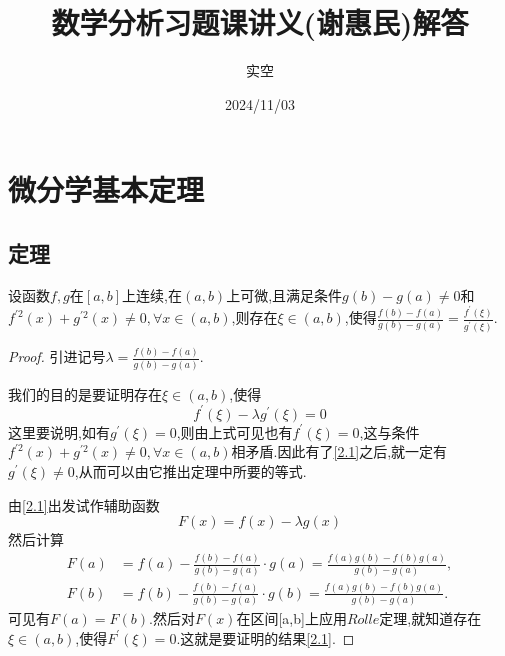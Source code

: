 \documentclass[lang=cn,newtx,10pt,scheme=chinese]{../Template/elegantbook}
\title{数学分析习题课讲义(谢惠民)解答}
\author{实空}
\date{2024/11/03}
\begin{document}
\maketitle
\frontmatter

\tableofcontents

\mainmatter%



\chapter{微分学基本定理}

\section{定理}

\begin{theorem}\label{the:2.1}
设函数$f,g$在$[a,b]$上连续,在$(a,b)$上可微,且满足条件$g(b)-g(a)\neq0$和$f^{\prime2}(x)+g^{\prime2}(x)\neq0,\forall x\in(a,b)$,则存在$\xi\in(a,b)$,使得$\frac{f(b)-f(a)}{g(b)-g(a)}=\frac{f^{\prime}(\xi)}{g^{\prime}(\xi)}$.
\end{theorem}
\begin{proof}
    引进记号$\lambda=\frac{f(b)-f(a)}{g(b)-g(a)}$.
    
    我们的目的是要证明存在$\xi\in(a,b)$,使得
    \begin{equation}\label{2.1}
        f^{\prime}(\xi)-\lambda g^{\prime}(\xi)=0
    \end{equation}
这里要说明,如有$g^{\prime}(\xi)=0$,则由上式可见也有$f^{\prime}(\xi)=0$,这与条件$f^{\prime2}(x)+g^{\prime2}(x)\neq0,\forall x\in(a,b)$相矛盾.因此有了\eqref{2.1}之后,就一定有$g^{\prime}(\xi)\neq0$,从而可以由它推出定理中所要的等式.

由\eqref{2.1}出发试作辅助函数
\begin{equation}
    F(x)=f(x)-\lambda g(x)
    \nonumber
\end{equation}
然后计算
\begin{align*}
F(a)&=f(a)-\frac{f(b)-f(a)}{g(b)-g(a)}\cdot g(a)=\frac{f(a)g(b)-f(b)g(a)}{g(b)-g(a)},\\
F(b)&=f(b)-\frac{f(b)-f(a)}{g(b)-g(a)}\cdot g(b)=\frac{f(a)g(b)-f(b)g(a)}{g(b)-g(a)}.
\end{align*}
可见有$F(a)=F(b)$.然后对$F(x)$在区间[a,b]上应用$Rolle$定理,就知道存在$\xi\in(a,b)$,使得$F^{\prime}(\xi)=0$.这就是要证明的结果\eqref{2.1}.

\end{proof}
\end{document}
